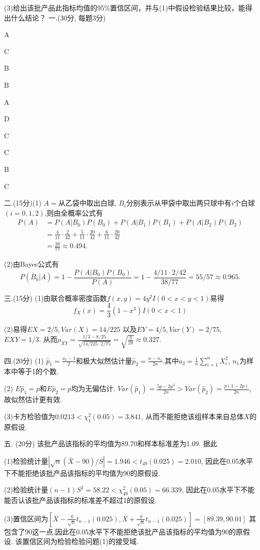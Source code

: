 \documentclass[12pt]{article}
\begin{document}
(3)给出该批产品此指标均值的95\%置信区间，并与(1)中假设检验结果比较，能得出什么结论？
\newpage
一.(30分, 每题3分)

\begin{inparaenum}
\item A\hfill
\item C\hfill
\item B\hfill
\item B\hfill
\item A\hfill
\item D\hfill
\item C\hfill
\item C\hfill
\item B\hfill
\item C\hfill
\end{inparaenum}

二.(15分)(1) $A=$从乙袋中取出白球, $B_i$分别表示从甲袋中取出两只球中有$i$个白球$(i=0,1,2)$,则由全概率公式有
\begin{align*}
P(A)&=P(A|B_0)P(B_0)+P(A|B_1)P(B_1)+P(A|B_2)P(B_2)\\
&=\frac{4}{11}\cdot\frac{2}{42}+\frac{5}{11}\cdot\frac{20}{42}
+\frac{6}{11}\cdot\frac{20}{42}\\
&=\frac{38}{77}\approx 0.494.
\end{align*}

(2)由Bayes公式有
\[
P(\bar B_0|A)=1-\frac{P(A|B_0)P(B_0)}{P(A)}=1-\frac{4/11\cdot 2/42}{38/77}=55/57\approx 0.965.
\]


三.(15分)
(1)由联合概率密度函数$f(x,y)=4y^2I(0<x<y<1)$易得
$$f_X(x)=\frac43(1-x^3)I(0<x<1)$$

(2)易得$EX=2/5, Var(X)=14/225$ 以及$EY=4/5, Var(Y)=2/75$, $EXY=1/3$.
从而$\rho_{XY}=\frac{1/3-8/25}{\sqrt{14/225\cdot2/75}}=\sqrt{\frac{3}{28}}\approx 0.327$.




四.(20分) (1) $\hat p_1=\frac{a_2-1}{2}$和极大似然估计量${\hat p}_2=\frac{n-n_1}{2n}$.其中$a_2=\frac{1}{n}\sum_{i=1}^nX_i^2$, $n_1$为样本中等于1的个数.

(2) $E\hat p_1=p$和$E{\hat p}_2=p$均为无偏估计. $Var(\hat p_1)=\frac{5p-2p^2}{2n}> Var(\hat p_2)=\frac{p(1-2p)}{2n}$, 故似然估计更有效.

(3)卡方检验值为$0.0213<\chi^2_1(0.05)=3.841$, 从而不能拒绝该组样本来自总体$X$的原假设.



五. (20分)
该批产品该指标的平均值为89.70和样本标准差为1.09. 据此

(1)检验统计量$|\sqrt{n}(\bar X-90)/S|=1.946<t_{49}(0.025)=2.010$, 因此在0.05水平下不能拒绝该批产品该指标的平均值为90的原假设.

(2)检验统计量$(n-1)S^2=58.22<\chi^2_{49}(0.05)=66.339$, 因此在0.05水平下不能能否认该批产品该指标的标准差不超过1的原假设.

(3)置信区间为$[\bar X-\frac{S}{\sqrt{n}}t_{n-1}(0.025),\bar X+\frac{S}{\sqrt{n}}t_{n-1}(0.025)]=[89.39,90.01]$ 其包含了90这一点,因此在0.05水平下不能拒绝该批产品该指标的平均值为90的原假设. 该置信区间为检验检验问题(1)的接受域.
\end{document}
